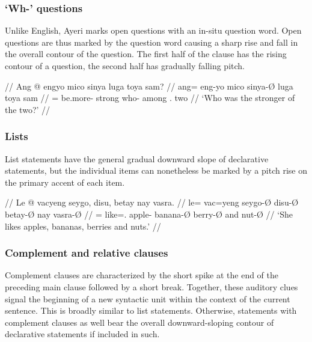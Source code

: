 \subsubsection{`Wh-' questions}

Unlike English, Ayeri marks open questions with an in-situ question word.
Open questions are thus marked by the question word causing a sharp rise and 
fall in the overall contour of the question. The first half of the clause has 
the rising contour of a question, the second half has gradually falling pitch.

\ex[belowexskip=0em]\begingl
	\glpreamble{} //
	\gla Ang @ engyo mico sinya luga toya sam? //
	\glb ang= eng-yo mico sinya-Ø luga toya sam //
	\glc \AgtT{}= be.more-\TsgN{} strong who-\Top{} among \TplN{}.\Loc{}
		two //
	\glft `Who was the stronger of the two?' //
\endgl\xe


\subsubsection{Lists}

List statements have the general gradual downward slope of declarative
statements, but the individual items can nonetheless be marked by a pitch rise
on the primary accent of each item.

\ex[belowexskip=0em]\begingl
	\glpreamble{} //
	\gla Le @ vacyeng seygo, disu, betay nay vasra. //
	\glb le= vac=yeng seygo-Ø disu-Ø betay-Ø nay vasra-Ø //
	\glc \PatTI{}= like=\TsgF{}.\Aarg{} apple-\Top{} banana-Ø berry-Ø and
		nut-Ø //
	\glft `She likes apples, bananas, berries and nuts.' //
\endgl\xe

\subsubsection{Complement and relative clauses}

Complement clauses are characterized by the short
spike at the end of the preceding main clause followed by a short break.
Together, these auditory clues signal the beginning of a new syntactic unit
within the context of the current sentence. This is broadly similar to list
statements. Otherwise, statements with complement clauses as well bear the
overall downward-sloping contour of declarative statements if included in such.

